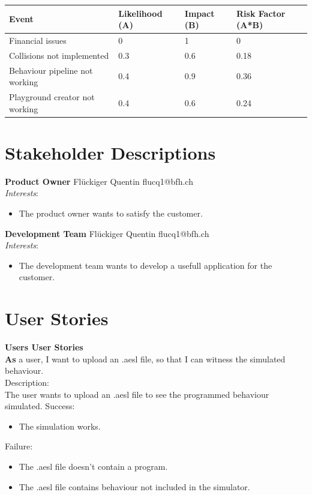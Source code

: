 \documentclass{scrbook}
\begin{document}
\begin{tabular}{p{2cm} p{2cm} p{2cm} p{2cm}}
  Event & Likelihood (A) & Impact (B) & Risk Factor (A*B) \\ \hline
  Financial issues & 0 & 1 & 0 \\
  Collisions not implemented & 0.3 & 0.6 & 0.18 \\
  Behaviour pipeline not working & 0.4 & 0.9 & 0.36 \\
  Playground creator not working & 0.4 & 0.6 & 0.24 \\
\end{tabular}

\section{Stakeholder Descriptions}
\textbf{Product Owner}
Flückiger Quentin flucq1@bfh.ch \\
\textit{Interests}:
\begin{itemize}
  \item The product owner wants to satisfy the customer.
\end{itemize}


\textbf{Development Team}
Flückiger Quentin flucq1@bfh.ch \\
\textit{Interests}:
\begin{itemize}
  \item The development team wants to develop a usefull application for the customer.
\end{itemize}

\section{User Stories}
\textbf{\large Users User Stories}\\
\textbf{As} a user, I want to upload an .aesl file, so that I can witness the simulated behaviour. \\
Description:\\
The user wants to upload an .aesl file to see the programmed behaviour simulated.
Success:\\
\begin{itemize}
  \item The simulation works.
\end{itemize}
Failure:\\
\begin{itemize}
  \item The .aesl file doesn't contain a program.
  \item The .aesl file contains behaviour not included in the simulator.
\end{itemize}
\end{document}
